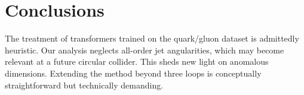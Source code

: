 \section{Conclusions}\label{sec:conclusions}

The treatment of transformers trained on the quark/gluon dataset is
admittedly heuristic. Our analysis neglects all-order jet angularities,
which may become relevant at a future circular collider. This sheds new
light on anomalous dimensions. Extending the method beyond three loops
is conceptually straightforward but technically demanding.

